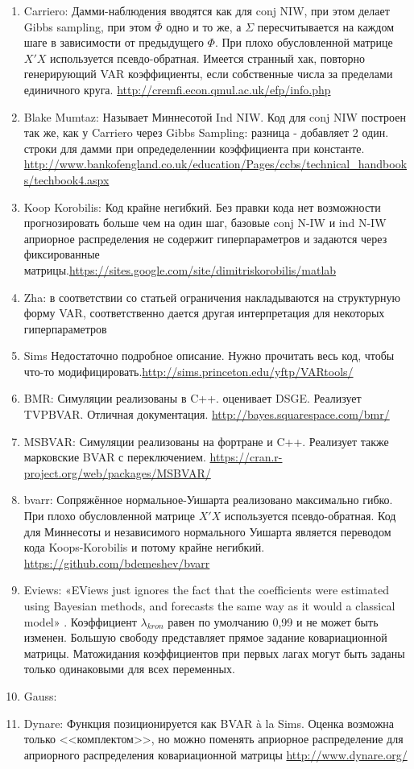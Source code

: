 \documentclass[11pt]{article} %
\newcommand{\post}{\overline}
\begin{document}
\begin{enumerate}
\item Carriero: Дамми-наблюдения вводятся как для conj NIW, при этом делает Gibbs sampling, при этом $\post\Phi$ одно и то же, а $\Sigma$ пересчитывается на каждом шаге в зависимости от предыдущего $\Phi$. При плохо обусловленной матрице $X'X$ используется псевдо-обратная. Имеется странный хак, повторно генерирующий VAR коэффициенты, если собственные числа за пределами единичного круга. \url{http://cremfi.econ.qmul.ac.uk/efp/info.php} 
\item Blake Mumtaz: Называет Миннесотой Ind NIW.  Код для conj NIW построен так же, как у Carriero через Gibbs Sampling: разница - добавляет 2 один. строки для дамми при опредеделеннии коэффициента при константе. \url{http://www.bankofengland.co.uk/education/Pages/ccbs/technical_handbooks/techbook4.aspx}
\item Koop Korobilis: Код крайне негибкий. Без правки кода нет возможности прогнозировать больше чем на один шаг, базовые conj N-IW и ind N-IW априорное распределения не содержит  гиперпараметров и задаются через фиксированные матрицы.\url{https://sites.google.com/site/dimitriskorobilis/matlab}\\
\item Zha: в соответствии со статьей ограничения накладываются на структурную форму VAR, соответственно дается другая интерпретация для некоторых гиперпараметров
\item Sims Недостаточно подробное описание. Нужно прочитать весь код, чтобы что-то модифицировать.\url{http://sims.princeton.edu/yftp/VARtools/}
\item BMR: Симуляции реализованы в C++.  оценивает DSGE.  Реализует TVPBVAR. Отличная документация. \url{ http://bayes.squarespace.com/bmr/} 
\item MSBVAR: Симуляции реализованы на фортране и C++. Реализует также марковские BVAR с переключением.  \url{https://cran.r-project.org/web/packages/MSBVAR/ }
\item bvarr: Сопряжённое нормальное-Уишарта реализовано максимально гибко.  При плохо обусловленной матрице $X'X$ используется псевдо-обратная. Код для Миннесоты и независимого нормального Уишарта является переводом кода Koops-Korobilis и потому крайне негибкий. \url{https://github.com/bdemeshev/bvarr }
\item Eviews: «EViews just ignores the fact that the coefficients were estimated using Bayesian methods, and forecasts the same way as it would a classical model» . Коэффициент $\lambda_{kron}$ равен по умолчанию 0,99 и не может быть изменен. Большую свободу представляет прямое задание ковариационной матрицы. Матожидания коэффициентов при первых лагах могут быть заданы только одинаковыми для всех переменных. 
\item Gauss: 
\item Dynare: Функция позиционируется как BVAR \`a la Sims. Оценка возможна только <<комплектом>>, но можно поменять априорное распределение для априорного распределения ковариационной матрицы  \url{http://www.dynare.org/}
\end{enumerate}
\end{document}
